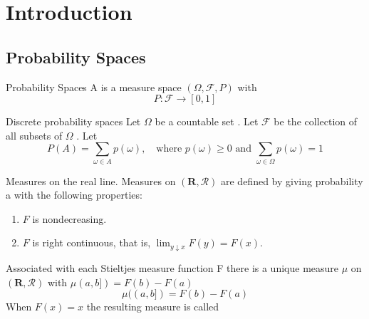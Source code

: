 \documentclass[../main.tex]{subfiles}
\begin{document}
\ifSubfilesClassLoaded{

    \tableofcontents
    
}{}

\chapter{Introduction}

\section{Probability Spaces}

\begin{definition}{Probability Spaces}{}
    A  is a measure space \(  \left(  \Omega ,\mathcal{F},P \right)   \) with \[
    P: \mathcal{F}\to \left[ 0,1 \right] 
    \] 
\end{definition}

\begin{example}{Discrete probability spaces}{}
    Let \(   \Omega   \) be a countable set .  Let \(  \mathcal{F}  \) be the collection of all subsets of \(   \Omega   \) .  Let \[
    P\left( A \right)= \sum _{ \omega \in A} p\left(  \omega  \right)  ,\quad \text{where } p\left(  \omega  \right)\ge 0 \text{ and } \sum _{ \omega \in  \Omega }p\left(  \omega  \right)= 1    
    \]   
\end{example}


\begin{example}{Measures on the real line.}{}
Measures on $(\mathbf{R}, \mathcal{R})$ are defined by giving probability a  with the following properties:
\begin{enumerate}
    \item[(i)] $F$ is nondecreasing.
    \item[(ii)] $F$ is right continuous, that is, $\lim_{y \downarrow x} F(y) = F(x)$.
\end{enumerate}
\end{example}

\begin{theorem}{}{}
Associated with each Stieltjes measure function F there is a unique measure $\mu$ on $(\mathbf{R}, \mathcal{R})$ with $\mu(a, b]) = F(b) - F(a)$
\begin{equation}
    \mu((a, b]) = F(b) - F(a) 
\end{equation}
When $F(x) = x$ the resulting measure is called 
\end{theorem}
\end{document}
